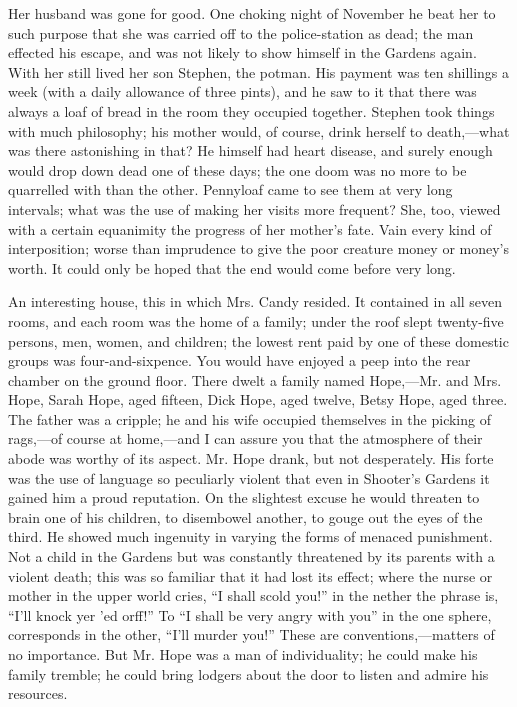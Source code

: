 Her husband was gone for good. One choking night of November he beat her
to such purpose that she was carried off to the police-station as dead;
the man effected his escape, and was not likely to show himself in the
Gardens again. With her still lived her son Stephen, the potman. His
payment was ten shillings a week (with a daily allowance of three
pints), and he saw to it that there was always a loaf of bread in the
room they occupied together. Stephen took things with much philosophy;
his mother would, of course, drink herself to death,---what was there
astonishing in that? He himself had heart disease, and surely enough
would drop down dead one of these days; the one doom was no more to be
quarrelled with than the other. Pennyloaf came to see them at very long
intervals; what was the use of making her visits more frequent? She,
too, viewed with a certain equanimity the progress of her mother's fate.
{\protect\hypertarget{5}{}{}}Vain every kind of interposition; worse
than imprudence to give the poor creature money or money's worth. It
could only be hoped that the end would come before very long.

An interesting house, this in which Mrs. Candy resided. It contained in
all seven rooms, and each room was the home of a family; under the roof
slept twenty-five persons, men, women, and children; the lowest rent
paid by one of these domestic groups was four-and-sixpence. You would
have enjoyed a peep into the rear chamber on the ground floor. There
dwelt a family named Hope,---Mr. and Mrs. Hope, Sarah Hope, aged
fifteen, Dick Hope, aged twelve, Betsy Hope, aged three. The father was
a cripple; he and his wife occupied themselves in the picking of
rags,---of course at home,---and I can assure you that the atmosphere of
their abode was worthy of its aspect. Mr. Hope drank, but not
desperately. His forte was the use of language so peculiarly violent
that even in Shooter's Gardens it gained him a proud reputation. On the
slightest excuse he would threaten to brain one of his children, to
disembowel another, to gouge out the eyes of the
{\protect\hypertarget{6}{}{}}third. He showed much ingenuity in varying
the forms of menaced punishment. Not a child in the Gardens but was
constantly threatened by its parents with a violent death; this was so
familiar that it had lost its effect; where the nurse or mother in the
upper world cries, ``I shall scold you!'' in the nether the phrase is,
``I'll knock yer 'ed orff!'' To ``I shall be very angry with you'' in
the one sphere, corresponds in the other, ``I'll murder you!'' These are
conventions,---matters of no importance. But Mr. Hope was a man of
individuality; he could make his family tremble; he could bring lodgers
about the door to listen and admire his resources.

